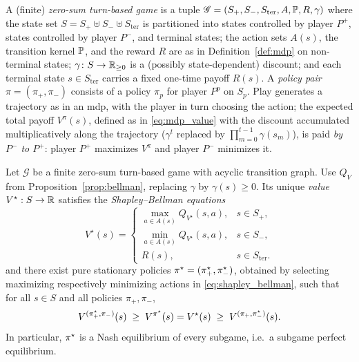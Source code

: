 \begin{definition}\label{def:turn_based_game}
A (finite) \emph{zero-sum turn-based game} is a tuple $\mathcal{G} = (S_{+}, S_{-}, S_{\mathrm{ter}}, A, \P, R, \gamma)$ where the state set $S = S_{+} \uplus S_{-} \uplus S_{\mathrm{ter}}$ is partitioned into states controlled by player $P^{+}$, states controlled by player $P^{-}$, and terminal states; the action sets $A(s)$, the transition kernel $\P$, and the reward $R$ are as in Definition~\ref{def:mdp} on non-terminal states; $\gamma \colon S \to \RR_{\ge 0}$ is a (possibly state-dependent) discount; and each terminal state $s \in S_{\mathrm{ter}}$ carries a fixed one-time payoff $R(s)$. A \emph{policy pair} $\pi = (\pi_{+}, \pi_{-})$ consists of a policy $\pi_{p}$ for player $P^{p}$ on $S_{p}$. Play generates a trajectory as in an \ac{mdp}, with the player in turn choosing the action; the expected total payoff $V^{\pi}(s)$, defined as in \eqref{eq:mdp_value} with the discount accumulated multiplicatively along the trajectory ($\gamma^t$ replaced by $\prod_{m=0}^{t-1}\gamma(s_m)$), is paid \emph{by $P^{-}$ to $P^{+}$}: player $P^{+}$ maximizes $V^{\pi}$ and player $P^{-}$ minimizes it.
\end{definition}

\begin{theoremenv}\label{thm:shapley_bellman}
Let $\mathcal{G}$ be a finite zero-sum turn-based game with acyclic transition graph. Use $Q_V$ from Proposition~\ref{prop:bellman}, replacing $\gamma$ by $\gamma(s)\ge0$. Its unique \emph{value} $V^{\star}:S\to\RR$ satisfies the \emph{Shapley--Bellman equations}
\begin{equation}
V^{\star}(s)=
\begin{cases}
\max_{a\in A(s)}Q_{V^{\star}}(s,a),&s\in S_+,\\
\min_{a\in A(s)}Q_{V^{\star}}(s,a),&s\in S_-,\\
R(s),&s\in S_{\mathrm{ter}}.
\end{cases}
\label{eq:shapley_bellman}
\end{equation}
and there exist pure stationary policies $\polstar = (\polstar_{+}, \polstar_{-})$, obtained by selecting maximizing respectively minimizing actions in \eqref{eq:shapley_bellman}, such that for all $s \in S$ and all policies $\pi_{+}, \pi_{-}$,
\begin{equation}
	V^{(\polstar_{+}, \pi_{-})}(s) \;\ge\; V^{\polstar}(s) = V^{\star}(s) \;\ge\; V^{(\pi_{+}, \polstar_{-})}(s).
	\label{eq:saddle_point}
\end{equation}
In particular, $\polstar$ is a Nash equilibrium of every subgame, i.e.\ a subgame perfect equilibrium.\end{theoremenv}

